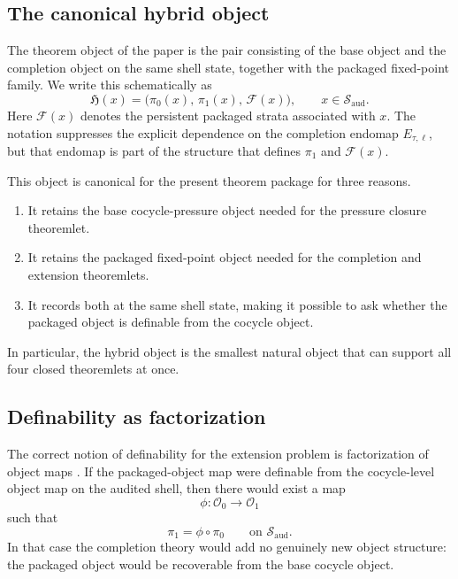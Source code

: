 \documentclass[11pt]{article}
\theoremstyle{definition}
\newcommand{\Hybrid}{\mathfrak{H}}
\begin{document}
\subsection{The canonical hybrid object}

The theorem object of the paper is the pair consisting of the base object and the completion object on the same shell state, together with the packaged fixed-point family. We write this schematically as
\[
\Hybrid(x)
=
\bigl(\pi_0(x),\,\pi_1(x),\,\mathcal{F}(x)\bigr),
\qquad x\in \mathcal{S}_{\mathrm{aud}}.
\]
Here \(\mathcal{F}(x)\) denotes the persistent packaged strata associated with \(x\). The notation suppresses the explicit dependence on the completion endomap \(E_{\tau,\ell}\), but that endomap is part of the structure that defines \(\pi_1\) and \(\mathcal{F}(x)\).

This object is canonical for the present theorem package for three reasons.

\begin{enumerate}
    \item It retains the base cocycle-pressure object needed for the pressure closure theoremlet.
    \item It retains the packaged fixed-point object needed for the completion and extension theoremlets.
    \item It records both at the same shell state, making it possible to ask whether the packaged object is definable from the cocycle object.
\end{enumerate}

In particular, the hybrid object is the smallest natural object that can support all four closed theoremlets at once.

\subsection{Definability as factorization}

The correct notion of definability for the extension problem is factorization of object maps \cite{LindMarcus1995SymbolicDynamics,Walters1986RelativePressure}. If the packaged-object map were definable from the cocycle-level object map on the audited shell, then there would exist a map
\[
\phi:\mathcal{O}_0\to \mathcal{O}_1
\]
such that
\[
\pi_1=\phi\circ\pi_0
\qquad\text{on }\mathcal{S}_{\mathrm{aud}}.
\]
In that case the completion theory would add no genuinely new object structure: the packaged object would be recoverable from the base cocycle object.
\end{document}
